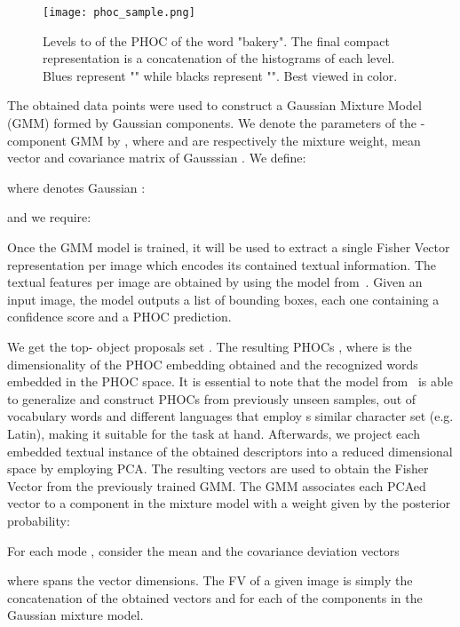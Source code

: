 \documentclass[10pt,twocolumn,letterpaper]{article}
\begin{document}
\begin{figure}[h]
\begin{center}
\texttt{[image: phoc\_sample.png]}
\end{center}
\caption{Levels  to  of the PHOC of the word "bakery". The final compact representation is a concatenation of the histograms of each level. Blues represent "" while blacks represent "". Best viewed in color.}
\label{fig:phoc_sample}
\end{figure}

The obtained data points were used to construct a Gaussian Mixture Model (GMM) \cite{gregor1969algorithm} formed by  Gaussian components. We denote the parameters of the -component GMM by , where  and  are respectively the mixture weight, mean vector and covariance matrix of Gausssian . We define:

where  denotes Gaussian :

and we require:


Once the GMM model is trained, it will be used to extract a single Fisher Vector representation per image which encodes its contained textual information. The textual features per image are obtained by using the model from~\cite{Gomez_2018_ECCV}. Given an input image, the model outputs a list of  bounding boxes, each one containing a confidence score  and a PHOC prediction. 




We get the top- object proposals set . The resulting PHOCs , where  is the dimensionality of the PHOC embedding obtained and  the recognized words embedded in the PHOC space. It is essential to note that the model from~\cite{Gomez_2018_ECCV} is able to generalize and construct PHOCs from previously unseen samples, out of vocabulary words and different languages that employ s similar character set (e.g. Latin), making it suitable for the task at hand. 
Afterwards, we project each embedded textual instance of the obtained descriptors into a reduced dimensional space by employing PCA. The resulting vectors are used to obtain the Fisher Vector \cite{perronnin2007fisher} from the previously trained GMM. The GMM associates each PCAed vector  to a component  in the mixture model with a weight given by the posterior probability:

For each mode , consider the mean and the covariance deviation vectors

where  spans the vector dimensions. The FV of a given image  is simply the concatenation of the obtained vectors  and  for each of the  components in the Gaussian mixture model.
\end{document}
